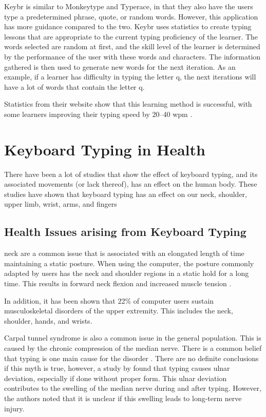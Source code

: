\documentclass{report}
\begin{document}
Keybr is similar to Monkeytype and Typerace, in that they also have the users
type a predetermined phrase, quote, or random words. However, this application
has more guidance compared to the two. Keybr uses statistics to create typing
lessons that are appropriate to the current typing proficiency of the learner.
The words selected are random at first, and the skill level of the learner is
determined by the performance of the user with these words and characters. The
information gathered is then used to generate new words for the next iteration.
As an example, if a learner has difficulty in typing the letter q, the next
iterations will have a lot of words that contain the letter q.

Statistics from their website show that this learning method is successful, with
some learners improving their typing speed by 20--40 \ac{wpm} \parencite{keybr}.

\section{Keyboard Typing in Health}

There have been a lot of studies that show the effect of keyboard typing, and
its associated movements (or lack thereof), has an effect on the human body.
These studies have shown that keyboard typing has an effect on our neck, shoulder,
upper limb, wrist, arms, and fingers \parencite{szeto2005, baker2007digit}

\subsection{Health Issues arising from Keyboard Typing}

\ac{neck} are a common issue that is associated with an elongated length of time
maintaining a static posture. When using the computer, the posture commonly
adapted by users has the neck and shoulder regions in a static hold for a long
time. This results in forward neck flexion and increased muscle tension
\parencite{szeto2005}.

In addition, it has been shown that 22\% of computer users sustain
musculoskeletal disorders of the upper extremity. This includes the neck,
shoulder, hands, and wrists. \parencite{gerr2002}

Carpal tunnel syndrome is also a common issue in the general population. This is
caused by the chronic compression of the median nerve. There is a common belief
that typing is one main cause for the disorder \parencite{carpal-myth}. There
are no definite conclusions if this myth is true, however, a study by
\citeauthor{toosi2015} found that typing causes ulnar deviation, especially if
done without proper form. This ulnar deviation contributes to the swelling of
the median nerve during and after typing. However, the authors noted that it is
unclear if this swelling leads to long-term nerve injury.
\end{document}
